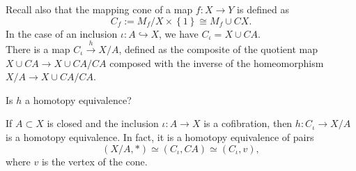 Recall also that the mapping cone of a
map $f \colon X \to Y$ is defined as
\[
C_f := M_f / X \times \left\{ 1 \right\} 
\cong M_f \cup CX.
\] 
In the case of an inclusion
$\iota \colon A \hookrightarrow X$, we have
$C_{\iota} = X \cup  CA$.\\
There is a map
$C_{\iota} \stackrel{h}{\to} X / A$, defined
as the composite of the quotient map
$X \cup  CA \to X \cup  CA /CA$ composed with the
inverse of the homeomorphism $X / A \to 
X \cup  CA /CA$.

\begin{question}
    Is $h$ a homotopy equivalence?
\end{question}

\begin{theorem}[]\label{Thm:2030akKAK}
    If $A \subset X$ is closed and the inclusion
    $\iota \colon A \to X$ is a cofibration, then
    $h \colon C_{\iota} \to X /A$ is a homotopy equivalence.
    In fact, it is a homotopy equivalence of pairs
    \[
        \left( X /A, * \right) \simeq
        \left( C_{\iota}, CA \right) \simeq
        \left( C_{\iota}, v \right) ,
    \] 
    where $v$ is the vertex of the cone.
\end{theorem}

